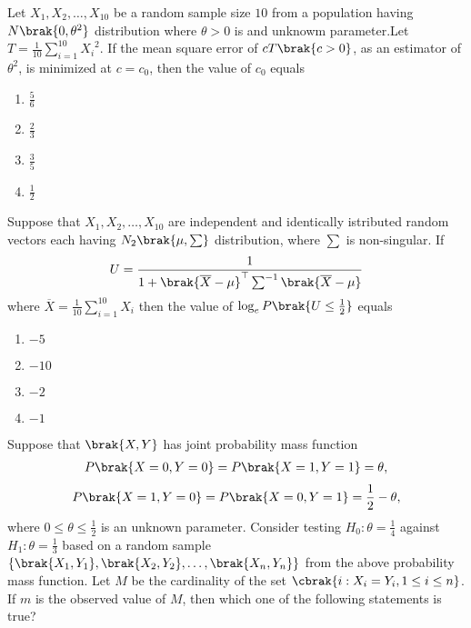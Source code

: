 \iffalse
\chapter{2023}
\author{EE24BTECH11011}
\section{st}
\fi
\item Let $X_1,X_2,\dots,X_{10}$ be a random sample size $10$ from a population having $N\brak{0,\theta^2}$ distribution where $\theta > 0$ is and unknowm parameter.Let $T = \frac{1}{10}\sum_{i=1}^{10} {X_i}^2$. If the mean square error of $cT\brak{c>0}$, as an estimator of $\theta^2$, is minimized at $c = c_0$, then the value of $c_0$ equals
\begin{multicols}{4}
\begin{enumerate}
    \item $\frac{5}{6}$
    \item $\frac{2}{3}$
    \item $\frac{3}{5}$
    \item $\frac{1}{2}$
\end{enumerate}
\end{multicols}
\item Suppose that $X_1,X_2,\dots,X_{10}$ are independent and identically istributed random
vectors each having $N_2\brak{\mu , \sum}$ distribution, where $\sum$ is non-singular. If
\begin{align}
    U = \frac{1}{1+\brak{\overline{X}-\mu}^\top \sum^{-1}\brak{\overline{X}-\mu}}
\end{align}
where $\overline{X} = \frac{1}{10}\sum_{i=1}^{10}X_i$ then the value of $\log_e P\brak{U \leq \frac{1}{2}}$ equals
\begin{multicols}{4}
    \begin{enumerate}
        \item $-5$
        \item $-10$
        \item $-2$
        \item $-1$
    \end{enumerate}
\end{multicols}
\item Suppose that $\brak{X, Y}$ has joint probability mass function
    \begin{align}
    P\brak{X=0, Y=0} = P\brak{X=1, Y=1} = \theta,
    \end{align}
    \begin{align}
    P\brak{X=1, Y=0} = P\brak{X=0, Y=1} = \frac{1}{2} - \theta,
\end{align}
    where $0 \leq \theta \leq \frac{1}{2}$ is an unknown parameter. Consider testing $H_0: \theta = \frac{1}{4}$
    against $H_1: \theta = \frac{1}{3}$ based on a random sample $\{\brak{X_1, Y_1}, \brak{X_2, Y_2}, \dots , \brak{X_n, Y_n}\}$
    from the above probability mass function. Let $M$ be the cardinality of the set
    $\cbrak{i: X_i = Y_i, 1 \leq i \leq n}$. If $m$ is the observed value of $M$, then which one of the
    following statements is true?


